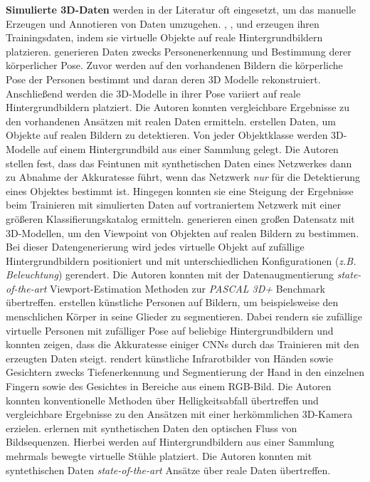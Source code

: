 \textbf{Simulierte 3D-Daten} werden in der Literatur oft eingesetzt, um das manuelle Erzeugen und Annotieren von Daten umzugehen. \citet{pishchulinArticulatedPeopleDetection2012a}, \citet{pengLearningDeepObject2014}, \citet{suRenderCNNViewpoint2015} und \citet{varolLearningSyntheticHumans2017} erzeugen ihren Trainingsdaten, indem sie virtuelle Objekte auf reale Hintergrundbildern platzieren. \citet{pishchulinArticulatedPeopleDetection2012a} generieren Daten zwecks Personenerkennung und Bestimmung derer körperlicher Pose. Zuvor werden auf den vorhandenen Bildern die körperliche Pose der Personen bestimmt und daran deren 3D Modelle rekonstruiert. Anschließend werden die 3D-Modelle in ihrer Pose variiert auf reale Hintergrundbildern platziert. Die Autoren konnten vergleichbare Ergebnisse zu den vorhandenen Ansätzen mit realen Daten ermitteln. \citet{pengLearningDeepObject2014} erstellen Daten, um Objekte auf realen Bildern zu detektieren. Von jeder Objektklasse werden 3D-Modelle auf einem Hintergrundbild aus einer Sammlung gelegt. Die Autoren stellen fest, dass das Feintunen mit synthetischen Daten eines Netzwerkes dann zu Abnahme der Akkuratesse führt, wenn das Netzwerk \textit{nur} für die Detektierung eines Objektes bestimmt ist. Hingegen konnten sie eine Steigung der Ergebnisse beim Trainieren mit simulierten Daten auf vortraniertem Netzwerk mit einer größeren Klassifierungskatalog ermitteln. \citet{suRenderCNNViewpoint2015} generieren einen großen Datensatz mit 3D-Modellen, um den Viewpoint von Objekten auf realen Bildern zu bestimmen. Bei dieser Datengenerierung wird jedes virtuelle Objekt auf zufällige Hintergrundbildern positioniert und mit unterschiedlichen Konfigurationen (\textit{z.B. Beleuchtung}) gerendert. Die Autoren konnten mit der Datenaugmentierung \textit{state-of-the-art} Viewport-Estimation Methoden zur \textit{PASCAL 3D+}\cite{xiangPASCALBenchmark3D2014} Benchmark übertreffen. \citet{varolLearningSyntheticHumans2017} erstellen künstliche Personen auf Bildern, um beispielsweise den menschlichen Körper in seine Glieder zu segmentieren. Dabei rendern sie zufällige virtuelle Personen mit zufälliger Pose auf beliebige Hintergrundbildern und konnten zeigen, dass die Akkuratesse einiger CNNs durch das Trainieren mit den erzeugten Daten steigt. \citet{fanelloLearningBeDepth2014} rendert künstliche Infrarotbilder von Händen sowie Gesichtern zwecks Tiefenerkennung und Segmentierung der Hand in den einzelnen Fingern sowie des Gesichtes in Bereiche aus einem RGB-Bild. Die Autoren konnten konventionelle Methoden über  Helligkeitsabfall übertreffen und vergleichbare Ergebnisse zu den Ansätzen mit einer herkömmlichen 3D-Kamera erzielen. \citet{dosovitskiyFlowNetLearningOptical2015} erlernen mit synthetischen Daten den optischen Fluss von Bildsequenzen.  Hierbei werden auf Hintergrundbildern aus einer Sammlung mehrmals bewegte virtuelle Stühle platziert. Die Autoren konnten mit syntethischen Daten \textit{state-of-the-art} Ansätze über reale Daten übertreffen.

